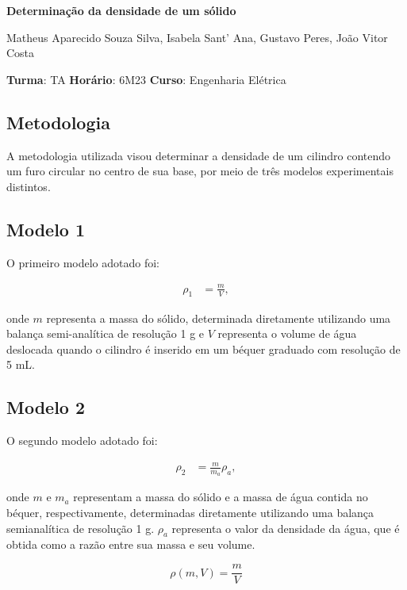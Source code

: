 \documentclass{article}
\begin{document}
\begin{center}
    \huge
    \textbf{Determinação da densidade de um sólido}
    \normalsize
    \vspace{10pt}

    Matheus Aparecido Souza Silva, Isabela Sant' Ana, Gustavo Peres, João Vitor Costa
    \vspace{5pt}

    \textbf{Turma}: TA \textbf{Horário}: 6M23 \textbf{Curso}: Engenharia Elétrica
\end{center}

\begin{multicols}{2}

\section{Metodologia}

A metodologia utilizada visou determinar a densidade de um cilindro contendo um furo circular no centro de sua base, por meio de três modelos experimentais distintos.

\subsection{Modelo 1}
O primeiro modelo adotado foi:

\begin{align}
\rho_1 &= \frac{m}{V},
\end{align}

onde $m$ representa a massa do sólido, determinada diretamente utilizando uma balança semi-analítica de resolução 1 g e $V$ representa o volume de água deslocada quando o cilindro é inserido em um béquer graduado com resolução de 5 mL.

\subsection{Modelo 2}
O segundo modelo adotado foi:

\begin{align}
\rho_2 &= \frac{m}{m_a} \rho_a,
\end{align}

onde $m$ e $m_a$ representam a massa do sólido e a massa de água contida no béquer, respectivamente, determinadas diretamente utilizando uma balança semianalítica de resolução 1 g. $\rho_a$ representa o valor da densidade da água, que é obtida como a razão entre sua massa e seu volume.

\begin{equation}
\rho(m, V) = \frac{m}{V}
\end{equation}


\end{multicols}
\end{document}
